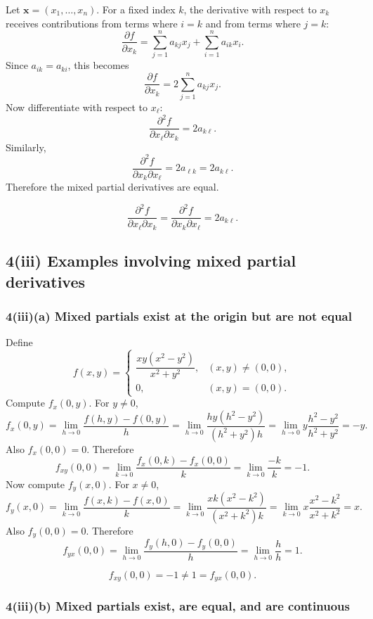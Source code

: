 \documentclass[11pt]{article}
\begin{document}
Let \(\mathbf x=(x_1,\dots,x_n)\). For a fixed index \(k\), the derivative with respect to \(x_k\) receives contributions from terms where \(i=k\) and from terms where \(j=k\):
\[
\frac{\partial f}{\partial x_k}
=\sum_{j=1}^n a_{kj}x_j+\sum_{i=1}^n a_{ik}x_i.
\]
Since \(a_{ik}=a_{ki}\), this becomes
\[
\frac{\partial f}{\partial x_k}=2\sum_{j=1}^n a_{kj}x_j.
\]
Now differentiate with respect to \(x_\ell\):
\[
\frac{\partial^2 f}{\partial x_\ell\partial x_k}=2a_{k\ell}.
\]
Similarly,
\[
\frac{\partial^2 f}{\partial x_k\partial x_\ell}=2a_{\ell k}=2a_{k\ell}.
\]
Therefore the mixed partial derivatives are equal.

\begin{answerbox}
\[
\boxed{\frac{\partial^2 f}{\partial x_\ell\partial x_k}
=\frac{\partial^2 f}{\partial x_k\partial x_\ell}=2a_{k\ell}.}
\]
\end{answerbox}

\subsection{4(iii) Examples involving mixed partial derivatives}

\subsubsection*{4(iii)(a) Mixed partials exist at the origin but are not equal}

Define
\[
f(x,y)=
\begin{cases}
\dfrac{xy(x^2-y^2)}{x^2+y^2},&(x,y)\neq(0,0),\\[6pt]
0,&(x,y)=(0,0).
\end{cases}
\]
Compute \(f_x(0,y)\). For \(y\neq0\),
\[
f_x(0,y)=\lim_{h\to0}\frac{f(h,y)-f(0,y)}{h}
=\lim_{h\to0}\frac{hy(h^2-y^2)}{(h^2+y^2)h}
=\lim_{h\to0} y\frac{h^2-y^2}{h^2+y^2}
=-y.
\]
Also \(f_x(0,0)=0\). Therefore
\[
f_{xy}(0,0)=\lim_{k\to0}\frac{f_x(0,k)-f_x(0,0)}{k}
=\lim_{k\to0}\frac{-k}{k}=-1.
\]
Now compute \(f_y(x,0)\). For \(x\neq0\),
\[
f_y(x,0)=\lim_{k\to0}\frac{f(x,k)-f(x,0)}{k}
=\lim_{k\to0}\frac{xk(x^2-k^2)}{(x^2+k^2)k}
=\lim_{k\to0}x\frac{x^2-k^2}{x^2+k^2}
=x.
\]
Also \(f_y(0,0)=0\). Therefore
\[
f_{yx}(0,0)=\lim_{h\to0}\frac{f_y(h,0)-f_y(0,0)}{h}
=\lim_{h\to0}\frac{h}{h}=1.
\]

\begin{answerbox}
\[
\boxed{f_{xy}(0,0)=-1\neq1=f_{yx}(0,0).}
\]
\end{answerbox}

\subsubsection*{4(iii)(b) Mixed partials exist, are equal, and are continuous}
\end{document}
